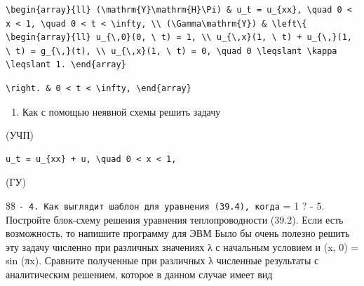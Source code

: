 \documentclass[
  ukrainian,
]{article}
\providecommand{\tightlist}{%
  \setlength{\itemsep}{0pt}\setlength{\parskip}{0pt}}
\begin{document}
\begin{verbatim}
\begin{array}{ll} (\mathrm{Y}\mathrm{H}\Pi) & u_t = u_{xx}, \quad 0 < x < 1, \quad 0 < t < \infty, \\ (\Gamma\mathrm{Y}) & \left\{ \begin{array}{ll} u_{\,0}(0, \ t) = 1, \\ u_{\,x}(1, \ t) + u_{\,}(1, \ t) = g_{\,}(t), \\ u_{\,x}(1, \ t) = 0, \quad 0 \leqslant \kappa \leqslant 1. \end{array}
\end{verbatim}

\begin{verbatim}
\right. & 0 < t < \infty, \end{array}
\end{verbatim}

\begin{enumerate}
\def\labelenumi{\arabic{enumi}.}
\setcounter{enumi}{2}
\tightlist
\item
  Как с помощью неявной схемы решить задачу
\end{enumerate}

(УЧП)

\begin{verbatim}
u_t = u_{xx} + u, \quad 0 < x < 1,
\end{verbatim}

(ГУ)

\$\$
\texttt{-\ 4.\ Как\ выглядит\ шаблон\ для\ уравнения\ (39.4),\ когда}
\lambda = 1 ? - 5. Постройте блок-схему решения уравнения
теплопроводности (39.2). Если есть возможность, то напишите программу
для ЭВМ Было бы очень полезно решить эту задачу численно при различных
значениях λ с начальным условием и (x, 0) = sin (πx). Сравните
полученные при различных λ численные результаты с аналитическим
решением, которое в данном случае имеет вид
\end{document}

